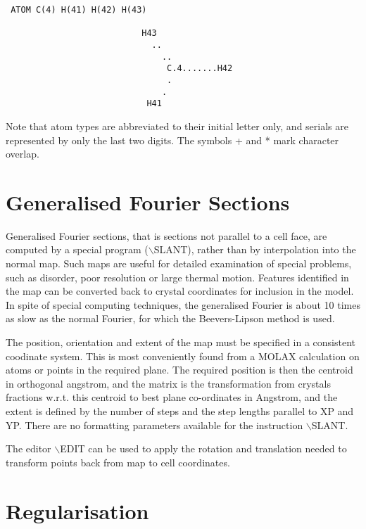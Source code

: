 \documentclass[10pt,a4paper]{report}
\begin{document}
 

\small\begin{verbatim}
 ATOM C(4) H(41) H(42) H(43)                
                                                
                           H43                  
                             ..                 
                               ..               
                                C.4.......H42   
                                .
                               .
                            H41
\end{verbatim}\normalsize

 Note that atom types are abbreviated to their
 initial letter only, and serials are represented
 by only the last two digits. The symbols + and * 
 mark character overlap.  



\chapter{Generalised Fourier Sections}


Generalised Fourier sections, that is sections not parallel to a cell face, are computed by a special program ($\backslash$SLANT), rather than by interpolation into  the normal map. Such maps are useful for detailed examination of special problems, such as disorder, poor resolution  or large thermal motion.  Features identified in the map can be converted back to crystal coordinates for inclusion in the model. In spite of special computing techniques, the generalised Fourier is about 10 times as slow as the normal Fourier, for which the Beevers-Lipson method is used.

The position, orientation and extent of the map must be specified in a  consistent coodinate system. This is most conveniently found from a MOLAX calculation on atoms or points in the required plane. The required position is then the centroid in orthogonal angstrom, and the matrix is the transformation from crystals fractions w.r.t. this centroid to best plane co-ordinates in Angstrom, and the extent is defined by the number of steps and the step lengths parallel to XP and YP. There are no formatting parameters available  for the instruction $\backslash$SLANT.

The editor $\backslash$EDIT can be used to apply the rotation and translation needed to transform points back from map to cell coordinates.\chapter{Regularisation}
\end{document}
